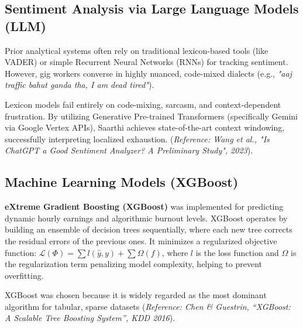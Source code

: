 \documentclass[12pt,a4paper]{article}
\begin{document}
\subsection{Sentiment Analysis via Large Language Models (LLM)}
\par\noindent
Prior analytical systems often rely on traditional lexicon-based tools (like VADER) or simple Recurrent Neural Networks (RNNs) for tracking sentiment. However, gig workers converse in highly nuanced, code-mixed dialects (e.g., \textit{"aaj traffic bahut ganda tha, I am dead tired"}).
\vspace{0.4cm}
\par\noindent
Lexicon models fail entirely on code-mixing, sarcasm, and context-dependent frustration. By utilizing Generative Pre-trained Transformers (specifically Gemini via Google Vertex APIs), Saarthi achieves state-of-the-art context windowing, successfully interpreting localized exhaustion. (\textit{Reference: Wang et al., "Is ChatGPT a Good Sentiment Analyzer? A Preliminary Study", 2023}).
\subsection{Machine Learning Models (XGBoost)}
\par\noindent
\textbf{eXtreme Gradient Boosting (XGBoost)} was implemented for predicting dynamic hourly earnings and algorithmic burnout levels. XGBoost operates by building an ensemble of decision trees sequentially, where each new tree corrects the residual errors of the previous ones. It minimizes a regularized objective function: $\mathcal{L}(\Phi) = \sum l(\hat{y}, y) + \sum \Omega(f)$, where $l$ is the loss function and $\Omega$ is the regularization term penalizing model complexity, helping to prevent overfitting.

\vspace{0.4cm}
\par\noindent
XGBoost was chosen because it is widely regarded as the most dominant algorithm for tabular, sparse datasets (\textit{Reference: Chen \& Guestrin, ``XGBoost: A Scalable Tree Boosting System'', KDD 2016}).
\end{document}
